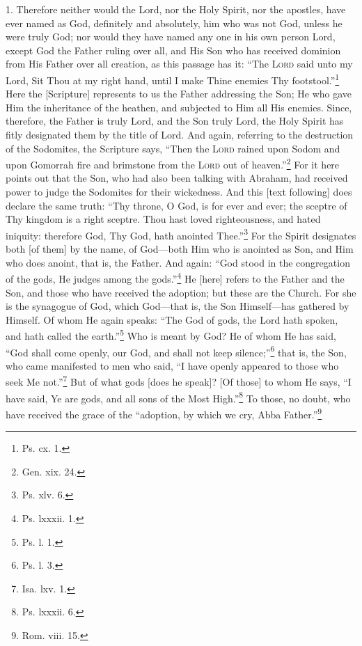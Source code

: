 
1. Therefore neither would the Lord, nor the Holy Spirit, nor the apostles, have ever named as God, definitely and absolutely, him who was not God, unless he were truly God; nor would they have named any one in his own person Lord, except God the Father ruling over all, and His Son who has received dominion from His Father over all creation, as this passage has it: “The \textsc{Lord} said unto my Lord, Sit Thou at my right hand, until I make Thine enemies Thy footstool.”\footnote{Ps. cx. 1.} Here the [Scripture] represents to us the Father addressing the Son; He who gave Him the inheritance of the heathen, and subjected to Him all His enemies. Since, therefore, the Father is truly Lord, and the Son truly Lord, the Holy Spirit has fitly designated them by the title of Lord. And again, referring to the destruction of the Sodomites, the Scripture says, “Then the \textsc{Lord} rained upon Sodom and upon Gomorrah fire and brimstone from the \textsc{Lord} out of heaven.”\footnote{Gen. xix. 24.} For it here points out that the Son, who had also been talking with Abraham, had received power to judge the Sodomites  for their wickedness. And this [text following] does declare the same truth: “Thy throne, O God, is for ever and ever; the sceptre of Thy kingdom is a right sceptre. Thou hast loved righteousness, and hated iniquity: therefore God, Thy God, hath anointed Thee.”\footnote{Ps. xlv. 6.} For the Spirit designates both [of them] by the name, of God—both Him who is anointed as Son, and Him who does anoint, that is, the Father. And again: “God stood in the congregation of the gods, He judges among the gods.”\footnote{Ps. lxxxii. 1.} He [here] refers to the Father and the Son, and those who have received the adoption; but these are the Church. For she is the synagogue of God, which God—that is, the Son Himself—has gathered by Himself. Of whom He again speaks: “The God of gods, the Lord hath spoken, and hath called the earth.”\footnote{Ps. l. 1.} Who is meant by God? He of whom He has said, “God shall come openly, our God, and shall not keep silence;”\footnote{Ps. l. 3.} that is, the Son, who came manifested to men who said, “I have openly appeared to those who seek Me not.”\footnote{Isa. lxv. 1.} But of what gods [does he speak]? [Of those] to whom He says, “I have said, Ye are gods, and all sons of the Most High.”\footnote{Ps. lxxxii. 6.} To those, no doubt, who have received the grace of the “adoption, by which we cry, Abba Father.”\footnote{Rom. viii. 15.}

